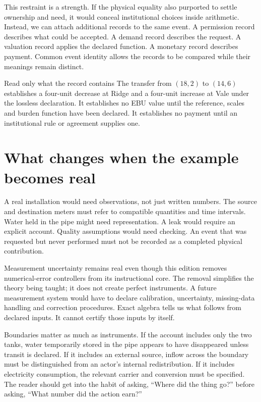 This restraint is a strength. If the physical equality also purported to settle ownership and need, it would conceal institutional choices inside arithmetic. Instead, we can attach additional records to the same event. A permission record describes what could be accepted. A demand record describes the request. A valuation record applies the declared function. A monetary record describes payment. Common event identity allows the records to be compared while their meanings remain distinct.

\begin{workedbox}{Read only what the record contains}
The transfer from $(18,2)$ to $(14,6)$ establishes a four-unit decrease at Ridge and a four-unit increase at Vale under the lossless declaration. It establishes no EBU value until the reference, scales and burden function have been declared. It establishes no payment until an institutional rule or agreement supplies one.
\end{workedbox}

\section{What changes when the example becomes real}
A real installation would need observations, not just written numbers. The source and destination meters must refer to compatible quantities and time intervals. Water held in the pipe might need representation. A leak would require an explicit account. Quality assumptions would need checking. An event that was requested but never performed must not be recorded as a completed physical contribution.

Measurement uncertainty remains real even though this edition removes numerical-error controllers from its instructional core. The removal simplifies the theory being taught; it does not create perfect instruments. A future measurement system would have to declare calibration, uncertainty, missing-data handling and correction procedures. Exact algebra tells us what follows from declared inputs. It cannot certify those inputs by itself.

Boundaries matter as much as instruments. If the account includes only the two tanks, water temporarily stored in the pipe appears to have disappeared unless transit is declared. If it includes an external source, inflow across the boundary must be distinguished from an actor's internal redistribution. If it includes electricity consumption, the relevant carrier and conversion must be specified. The reader should get into the habit of asking, ``Where did the thing go?'' before asking, ``What number did the action earn?''

